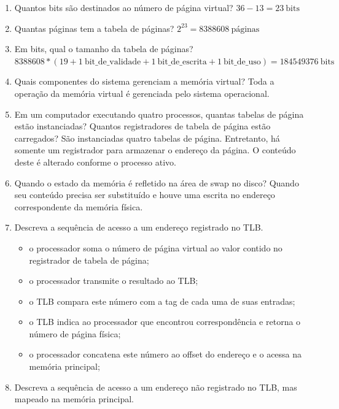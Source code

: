 \documentclass{article}
\begin{document}
\begin{enumerate}
\item Quantos bits são destinados ao número de página virtual? $36 - 13 = 23\ \text{bits}$

\item Quantas páginas tem a tabela de páginas? $2^{23} = 8388608\ \text{páginas}$

\item Em bits, qual o tamanho da tabela de páginas? $8388608 * (19 + 1\ \text{bit\_de\_validade} + 1\ \text{bit\_de\_escrita} + 1\ \text{bit\_de\_uso}) = 184549376\ \text{bits}$

\item Quais componentes do sistema gerenciam a memória virtual? Toda a operação da memória virtual é gerenciada pelo sistema operacional.

\item Em um computador executando quatro processos, quantas tabelas de página estão instanciadas? Quantos registradores de tabela de página estão carregados? São instanciadas quatro tabelas de página. Entretanto, há somente um registrador para armazenar o endereço da página. O conteúdo deste é alterado conforme o processo ativo.

\item Quando o estado da memória é refletido na área de swap no disco? Quando seu conteúdo precisa ser substituído e houve uma escrita no endereço correspondente da memória física.

\item Descreva a sequência de acesso a um endereço registrado no TLB.

\begin{itemize}
    \item o processador soma o número de página virtual ao valor contido no registrador de tabela de página;
    \item o processador transmite o resultado ao TLB;
    \item o TLB compara este número com a tag de cada uma de suas entradas;
    \item o TLB indica ao processador que encontrou correspondência e retorna o número de página física;
    \item o processador concatena este número ao offset do endereço e o acessa na memória principal;
\end{itemize}

\item Descreva a sequência de acesso a um endereço não registrado no TLB, mas mapeado na memória principal.


\end{enumerate}
\end{document}

